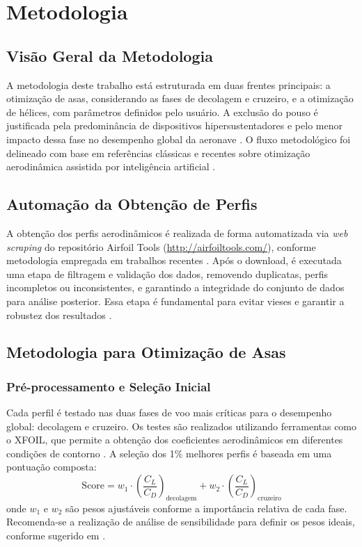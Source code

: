 \chapter{Metodologia}

\section{Visão Geral da Metodologia}
A metodologia deste trabalho está estruturada em duas frentes principais: a otimização de asas, considerando as fases de decolagem e cruzeiro, e a otimização de hélices, com parâmetros definidos pelo usuário. A exclusão do pouso é justificada pela predominância de dispositivos hipersustentadores e pelo menor impacto dessa fase no desempenho global da aeronave \cite{raymer2018aircraft, abbott1959theory}. O fluxo metodológico foi delineado com base em referências clássicas e recentes sobre otimização aerodinâmica assistida por inteligência artificial \cite{oliveira2023, hasan2024, wu2024}.

\section{Automação da Obtenção de Perfis}
A obtenção dos perfis aerodinâmicos é realizada de forma automatizada via \textit{web scraping} do repositório Airfoil Tools (\url{http://airfoiltools.com/}), conforme metodologia empregada em trabalhos recentes \cite{oliveira2023}. Após o download, é executada uma etapa de filtragem e validação dos dados, removendo duplicatas, perfis incompletos ou inconsistentes, e garantindo a integridade do conjunto de dados para análise posterior. Essa etapa é fundamental para evitar vieses e garantir a robustez dos resultados \cite{abbott1959theory}.

\section{Metodologia para Otimização de Asas}

\subsection{Pré-processamento e Seleção Inicial}
Cada perfil é testado nas duas fases de voo mais críticas para o desempenho global: decolagem e cruzeiro. Os testes são realizados utilizando ferramentas como o XFOIL, que permite a obtenção dos coeficientes aerodinâmicos em diferentes condições de contorno \cite{drela1989xfoil}. A seleção dos 1\% melhores perfis é baseada em uma pontuação composta:
\[
\text{Score} = w_1 \cdot \left(\frac{C_L}{C_D}\right)_{\text{decolagem}} + w_2 \cdot \left(\frac{C_L}{C_D}\right)_{\text{cruzeiro}}
\]
onde \(w_1\) e \(w_2\) são pesos ajustáveis conforme a importância relativa de cada fase. Recomenda-se a realização de análise de sensibilidade para definir os pesos ideais, conforme sugerido em \cite{oliveira2023, hasan2024}.

